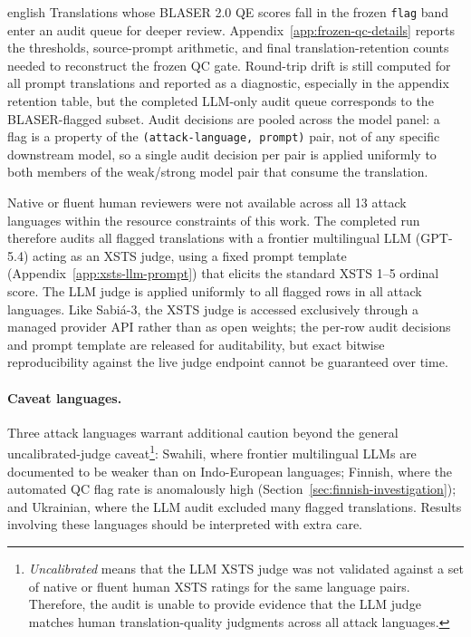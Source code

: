 \begin{otherlanguage*}{english}
Translations whose BLASER 2.0 QE scores fall in the frozen \texttt{flag} band enter an audit queue for deeper review. Appendix~\ref{app:frozen-qc-details} reports the thresholds, source-prompt arithmetic, and final translation-retention counts needed to reconstruct the frozen QC gate. Round-trip drift is still computed for all prompt translations and reported as a diagnostic, especially in the appendix retention table, but the completed LLM-only audit queue corresponds to the BLASER-flagged subset. Audit decisions are pooled across the model panel: a flag is a property of the \texttt{(attack-language, prompt)} pair, not of any specific downstream model, so a single audit decision per pair is applied uniformly to both members of the weak/strong model pair that consume the translation.

Native or fluent human reviewers were not available across all 13 attack languages within the resource constraints of this work. The completed run therefore audits all flagged translations with a frontier multilingual LLM (GPT-5.4) acting as an XSTS judge, using a fixed prompt template (Appendix~\ref{app:xsts-llm-prompt}) that elicits the standard XSTS 1--5 ordinal score. The LLM judge is applied uniformly to all flagged rows in all attack languages. Like Sabi\'a-3, the XSTS judge is accessed exclusively through a managed provider API rather than as open weights; the per-row audit decisions and prompt template are released for auditability, but exact bitwise reproducibility against the live judge endpoint cannot be guaranteed over time.

\paragraph*{Caveat languages.} Three attack languages warrant additional caution beyond the general uncalibrated-judge caveat\footnote{\emph{Uncalibrated} means that the LLM XSTS judge was not validated against a set of native or fluent human XSTS ratings for the same language pairs. Therefore, the audit is unable to provide evidence that the LLM judge matches human translation-quality judgments across all attack languages.}: Swahili, where frontier multilingual LLMs are documented to be weaker than on Indo-European languages; Finnish, where the automated QC flag rate is anomalously high (Section~\ref{sec:finnish-investigation}); and Ukrainian, where the LLM audit excluded many flagged translations. Results involving these languages should be interpreted with extra care.


\end{otherlanguage*}
